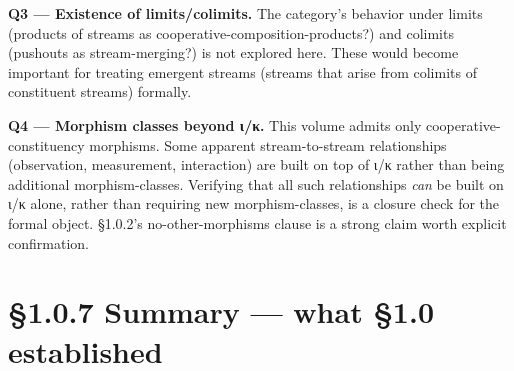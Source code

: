 \documentclass[11pt, openany]{book}
\newcommand{\sectionbreak}{\clearpage}
\begin{document}
\textbf{Q3 --- Existence of limits/colimits.} The category's behavior under limits (products of streams as cooperative-composition-products?) and colimits (pushouts as stream-merging?) is not explored here. These would become important for treating emergent streams (streams that arise from colimits of constituent streams) formally.

\textbf{Q4 --- Morphism classes beyond ι/κ.} This volume admits only cooperative-constituency morphisms. Some apparent stream-to-stream relationships (observation, measurement, interaction) are built on top of ι/κ rather than being additional morphism-classes. Verifying that all such relationships \textit{can} be built on ι/κ alone, rather than requiring new morphism-classes, is a closure check for the formal object. §1.0.2's no-other-morphisms clause is a strong claim worth explicit confirmation.

\sectionbreak

\section{§1.0.7 Summary --- what §1.0 established}
\end{document}
